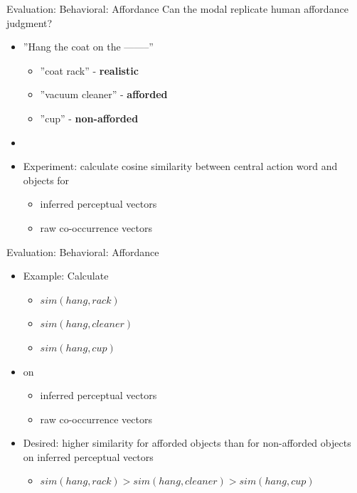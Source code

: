 \documentclass[12pt,a4paper]{beamer}
\begin{document}
\begin{frame}{Evaluation: Behavioral: Affordance}
Can the modal replicate human affordance judgment?
\begin{itemize}
\item ''Hang the coat on the --------''
    \begin{itemize}
    \item ''coat rack'' - \textbf{realistic}
    \item ''vacuum cleaner'' - \textbf{afforded}
    \item ''cup'' - \textbf{non-afforded}
    \end{itemize}
\item 
\item Experiment: calculate cosine similarity between central action word and objects for
    \begin{itemize}
    \item inferred perceptual vectors
    \item raw co-occurrence vectors
    \end{itemize}
\end{itemize}
\end{frame}



\begin{frame}{Evaluation: Behavioral: Affordance}
\begin{itemize}
\item Example: Calculate
    \begin{itemize}
    \item $sim(hang,rack)$
    \item $sim(hang,cleaner)$
    \item $sim(hang,cup)$
    \end{itemize}
\item on
    \begin{itemize}
    \item inferred perceptual vectors
    \item raw co-occurrence vectors
    \end{itemize}
\item Desired: higher similarity for afforded objects than for non-afforded objects on inferred perceptual vectors
    \begin{itemize}
    \item $sim(hang,rack) > sim(hang,cleaner) > sim(hang,cup)$
    \end{itemize}
\end{itemize}
\end{frame}
\end{document}
